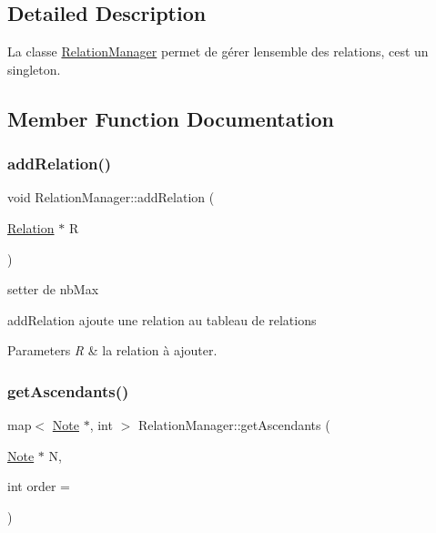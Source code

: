 \subsection{Detailed Description}
La classe \hyperlink{classRelationManager}{Relation\+Manager} permet de gérer l\textquotesingle{}ensemble des relations, c\textquotesingle{}est un singleton. 

\subsection{Member Function Documentation}
\mbox{\label{classRelationManager_ac48cfb1433282f4fe1f0a94c5a9520ae}} 
\subsubsection{\texorpdfstring{add\+Relation()}{addRelation()}}
{\footnotesize\ttfamily void Relation\+Manager\+::add\+Relation (\begin{DoxyParamCaption}\item[{\hyperlink{classRelation}{Relation} $\ast$}]{R }\end{DoxyParamCaption})\hspace{0.3cm}{\ttfamily [static]}}



setter de nb\+Max 

add\+Relation ajoute une relation au tableau de relations 
\begin{DoxyParams}{Parameters}
{\em R} & la relation à ajouter. \\
\hline
\end{DoxyParams}
\mbox{\label{classRelationManager_a5566fe92255e852c87c97c18e6f55c11}} 
\subsubsection{\texorpdfstring{get\+Ascendants()}{getAscendants()}}
{\footnotesize\ttfamily map$<$ \hyperlink{classNote}{Note} $\ast$, int $>$ Relation\+Manager\+::get\+Ascendants (\begin{DoxyParamCaption}\item[{\hyperlink{classNote}{Note} $\ast$}]{N,  }\item[{int}]{order = {} }\end{DoxyParamCaption})\hspace{0.3cm}{\ttfamily [static]}}



